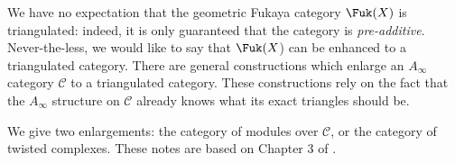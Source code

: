 
We have no expectation that the geometric Fukaya category $\Fuk(X)$ is triangulated: indeed, it is only guaranteed that the category is \emph{pre-additive}. Never-the-less, we would like to say that $\Fuk(X$) can be enhanced to a triangulated category.
There are general constructions which enlarge an $A_\infty$ category $\mathcal C$ to a triangulated category. These constructions rely on the fact that the $A_\infty$ structure on $\mathcal C$ already knows what its exact triangles should be. 

We give two enlargements: the category of modules over $\mathcal C$, or the category of twisted complexes. These notes are based on Chapter 3 of \cite{seidel2008fukaya}.





